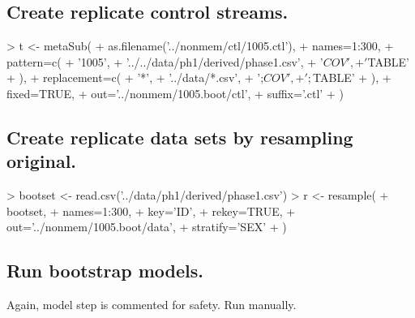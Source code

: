 \subsection{Create replicate control streams.}
\begin{Schunk}
\begin{Sinput}
> t <- metaSub(
+      as.filename('../nonmem/ctl/1005.ctl'),
+      names=1:300,
+      pattern=c(
+          '1005',
+          '../../data/ph1/derived/phase1.csv',
+          '$COV',
+          '$TABLE'
+      ),
+      replacement=c(
+          '*',
+          '../data/*.csv',
+          ';$COV',
+          ';$TABLE'
+     ),
+     fixed=TRUE,
+     out='../nonmem/1005.boot/ctl',
+     suffix='.ctl'
+  )
\end{Sinput}
\end{Schunk}
\subsection{Create replicate data sets by resampling original.}
\begin{Schunk}
\begin{Sinput}
>  bootset <- read.csv('../data/ph1/derived/phase1.csv')
>  r <- resample(
+  	bootset,
+  	names=1:300,
+  	key='ID',
+  	rekey=TRUE,
+  	out='../nonmem/1005.boot/data',
+  	stratify='SEX'
+  )
\end{Sinput}
\end{Schunk}
\subsection{Run bootstrap models.}
Again, model step is commented for safety.  Run manually.

